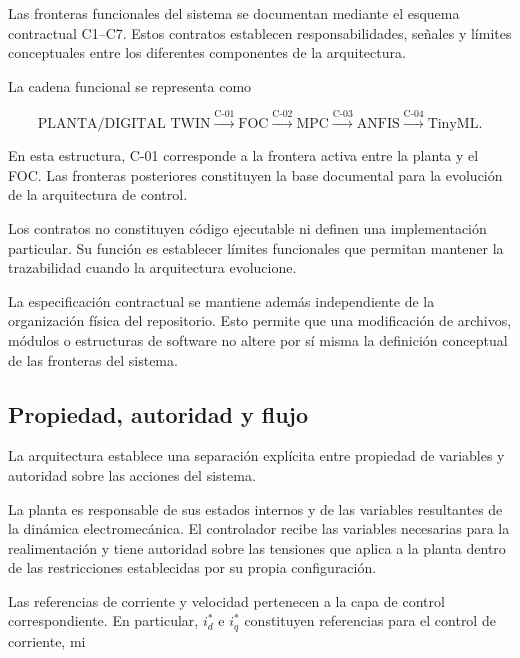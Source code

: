 Las fronteras funcionales del sistema se documentan mediante el esquema contractual C1--C7. Estos contratos establecen responsabilidades, señales y límites conceptuales entre los diferentes componentes de la arquitectura.

La cadena funcional se representa como

\begin{equation}
\text{PLANTA/DIGITAL TWIN}
\xrightarrow{\mathrm{C\text{-}01}}
\text{FOC}
\xrightarrow{\mathrm{C\text{-}02}}
\text{MPC}
\xrightarrow{\mathrm{C\text{-}03}}
\text{ANFIS}
\xrightarrow{\mathrm{C\text{-}04}}
\text{TinyML}.
\end{equation}

En esta estructura, C-01 corresponde a la frontera activa entre la planta y el FOC. Las fronteras posteriores constituyen la base documental para la evolución de la arquitectura de control.

Los contratos no constituyen código ejecutable ni definen una implementación particular. Su función es establecer límites funcionales que permitan mantener la trazabilidad cuando la arquitectura evolucione.

La especificación contractual se mantiene además independiente de la organización física del repositorio. Esto permite que una modificación de archivos, módulos o estructuras de software no altere por sí misma la definición conceptual de las fronteras del sistema.

\subsection{Propiedad, autoridad y flujo}

La arquitectura establece una separación explícita entre propiedad de variables y autoridad sobre las acciones del sistema.

La planta es responsable de sus estados internos y de las variables resultantes de la dinámica electromecánica. El controlador recibe las variables necesarias para la realimentación y tiene autoridad sobre las tensiones que aplica a la planta dentro de las restricciones establecidas por su propia configuración.

Las referencias de corriente y velocidad pertenecen a la capa de control correspondiente. En particular, $i_d^\ast$ e $i_q^\ast$ constituyen referencias para el control de corriente, mi
